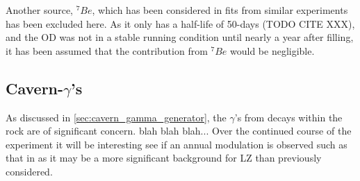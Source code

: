 \par

\par
Another source, ${}^{7}Be$, which has been considered in fits from similar experiments has been excluded here.
As it only has a half-life of 50-days (TODO CITE XXX), and the OD was not in a stable running condition until nearly a year after filling, it has been assumed that the contribution from ${}^{7}Be$ would be negligible.


\subsection{Cavern-$\gamma$'s}
\par
As discussed in \autoref{sec:cavern_gamma_generator}, the $\gamma$'s from decays within the rock are of significant concern.
blah blah blah...
Over the continued course of the experiment it will be interesting see if an annual modulation is observed such as that in \cite{cavern_gamma_annual_modulation_CoGeNT_ref, cavern_gammas_in_Soudan_mine_ref} as it may be a more significant background for LZ than previously considered.

\fi